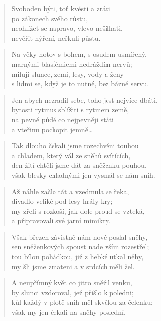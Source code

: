 \documentclass{book}
\begin{document}
\begin{verse}
Svoboden býti, toť kvésti a zráti\\
po zákonech svého růstu,\\
neohlížet se napravo, vlevo nešilhati,\\
nevěřit hýření, neřkuli půstu.
\end{verse}
\begin{verse}
Na věky hotov s bohem, s osudem usmířený,\\
marnými blasfémiemi nedráždím nervů;\\
miluji slunce, zemi, lesy, vody a ženy --\\
s lidmi se, když je to nutné, bez bázně servu.
\end{verse}
\begin{verse}
Jen abych nezradil sebe, toho jest nejvíce dbáti,\\
bytosti rytmus sblížiti s rytmem země,\\
na pevné půdě co nejpevněji státi\\
a vteřinu pochopit jemně\ldots
\end{verse}
\newpage
{}
\begin{verse}
Tak dlouho čekali jsme rozechvěni touhou\\
a chladem, který vál ze sněhů svítících,\\
den žití chtěli jsme dát za sněženku pouhou,\\
však blesky chladnými jen vysmál se nám sníh.
\end{verse}
\begin{verse}
Až náhle začlo tát a vzedmula se řeka,\\
divadlo veliké pod lesy hrály kry;\\
my zřeli s rozkoší, jak dole proud se vzteká,\\
a připravovali své jarní mimikry.
\end{verse}
\begin{verse}
Však březen závistně nám nové poslal sněhy,\\
sen sněženkových spoust nade vším rozestřel;\\
tou bílou pohádkou, již z hebké utkal něhy,\\
my šli jsme zmateni a v srdcích měli žel.
\end{verse}
\begin{verse}
A neupřímný květ co jitro sněžil venku,\\
by slunci vzdoroval, jež přišlo k poledni;\\
kůl každý v plotě sníh měl skvělou za čelenku;\\
však my jen čekali na sněhy poslední.
\end{verse}
\end{document}
